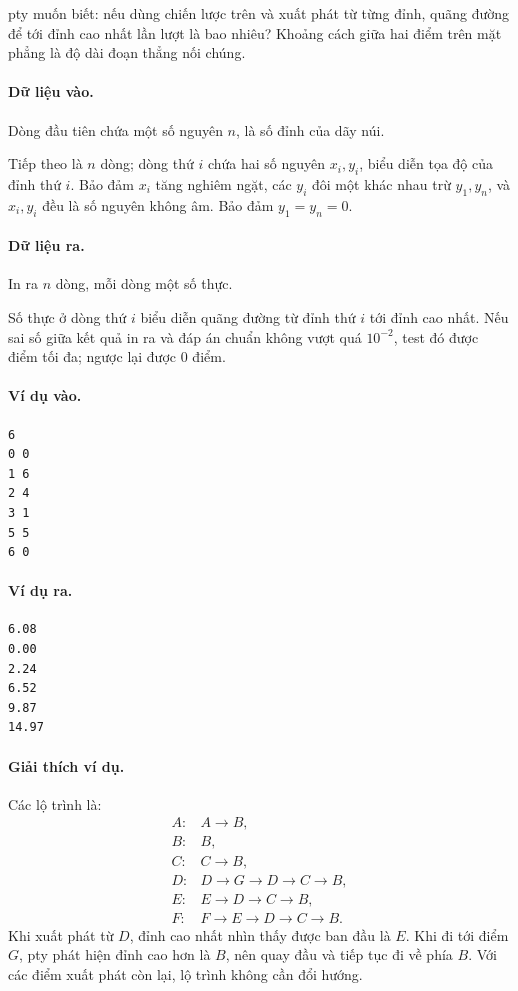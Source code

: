 \documentclass[11pt]{article}
\begin{document}
pty muốn biết: nếu dùng chiến lược trên và xuất phát từ từng đỉnh, quãng
đường để tới đỉnh cao nhất lần lượt là bao nhiêu? Khoảng cách giữa hai điểm
trên mặt phẳng là độ dài đoạn thẳng nối chúng.

\paragraph{Dữ liệu vào.}
Dòng đầu tiên chứa một số nguyên \(n\), là số đỉnh của dãy núi.

Tiếp theo là \(n\) dòng; dòng thứ \(i\) chứa hai số nguyên \(x_i,y_i\), biểu
diễn tọa độ của đỉnh thứ \(i\). Bảo đảm \(x_i\) tăng nghiêm ngặt, các
\(y_i\) đôi một khác nhau trừ \(y_1,y_n\), và \(x_i,y_i\) đều là số nguyên
không âm. Bảo đảm \(y_1=y_n=0\).

\paragraph{Dữ liệu ra.}
In ra \(n\) dòng, mỗi dòng một số thực.

Số thực ở dòng thứ \(i\) biểu diễn quãng đường từ đỉnh thứ \(i\) tới đỉnh cao
nhất. Nếu sai số giữa kết quả in ra và đáp án chuẩn không vượt quá
\(10^{-2}\), test đó được điểm tối đa; ngược lại được \(0\) điểm.

\paragraph{Ví dụ vào.}
\begin{verbatim}
6
0 0
1 6
2 4
3 1
5 5
6 0
\end{verbatim}

\paragraph{Ví dụ ra.}
\begin{verbatim}
6.08
0.00
2.24
6.52
9.87
14.97
\end{verbatim}

\paragraph{Giải thích ví dụ.}
Các lộ trình là:
\[
\begin{array}{ll}
A: & A\to B,\\
B: & B,\\
C: & C\to B,\\
D: & D\to G\to D\to C\to B,\\
E: & E\to D\to C\to B,\\
F: & F\to E\to D\to C\to B.
\end{array}
\]
Khi xuất phát từ \(D\), đỉnh cao nhất nhìn thấy được ban đầu là \(E\). Khi đi
tới điểm \(G\), pty phát hiện đỉnh cao hơn là \(B\), nên quay đầu và tiếp tục
đi về phía \(B\). Với các điểm xuất phát còn lại, lộ trình không cần đổi
hướng.
\end{document}
